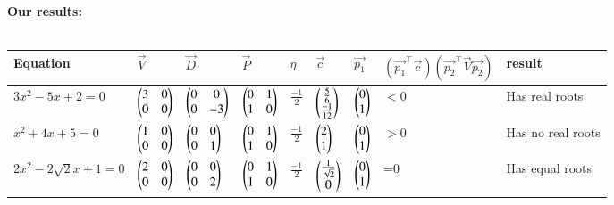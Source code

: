 \documentclass[journal,12pt,twocolumn]{IEEEtran}
\begin{document}
\cleardoublepage 
\textbf{Our results:}\\\\
\begin{tabular}{ |p{2.5cm}||p{1.5cm}|p{1.5cm}|p{1.5cm}|p{1cm}|p{1cm}|p{1cm}| p{2.5cm}|p{2cm}| }
 \hline
 Equation & $\vec{V}$ & $\vec{D}$ &$\vec{P}$&$\eta$ & $\vec{c}$& $\vec{p_1}$ & $(\vec{p_1}^{\top}\vec{c}) (\vec{p_2}^{\top}\vec{V}\vec{p_2})$& result \\
 \hline
 $3x^2-5x+2=0$   & $\begin{pmatrix}3 & 0 \\ 0 & 0\end{pmatrix}$    & $\begin{pmatrix}0 & 0 \\ 0 & -3\end{pmatrix}$ & $\begin{pmatrix} 0 & 1 \\ 1 & 0\end{pmatrix} $ & $\frac{-1}{2}$ & $\begin{pmatrix}\frac{5}{6} \\\frac{-1}{12}\end{pmatrix}$&$\begin{pmatrix}0 \\ 1\end{pmatrix}$ & $<0$& Has real roots  \\
 $x^2+4x+5=0$ &   $\begin{pmatrix}1 & 0 \\ 0 & 0\end{pmatrix}$    & $\begin{pmatrix}0 & 0 \\ 0 & 1\end{pmatrix}$   &$\begin{pmatrix} 0 & 1 \\ 1 & 0\end{pmatrix} $ & $\frac{-1}{2}$ & $\begin{pmatrix}2 \\ 1\end{pmatrix}$ &$\begin{pmatrix}0 \\ 1\end{pmatrix}$& $>0$ & Has no real roots\\
 $2x^2-2\sqrt{2}x+1=0$ &$\begin{pmatrix}2 & 0 \\ 0 & 0\end{pmatrix}$& $\begin{pmatrix}0 & 0 \\ 0 & 2\end{pmatrix}$    &$\begin{pmatrix} 0 & 1 \\ 1 & 0\end{pmatrix} $ & $\frac{-1}{2}$  & $\begin{pmatrix}\frac{1}{\sqrt{2}} \\ 0\end{pmatrix}$& $\begin{pmatrix}0 \\ 1\end{pmatrix}$& =0 & Has equal roots\\

 \hline
\end{tabular}
\end{document}
